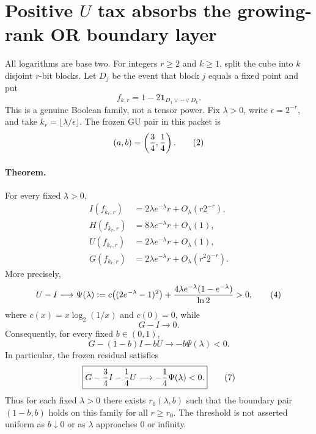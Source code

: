 \section*{Positive $U$ tax absorbs the growing-rank OR boundary layer}

All logarithms are base two.  For integers $r\ge2$ and
$k\ge1$, split the cube into $k$ disjoint $r$-bit blocks.  Let $D_j$
be the event that block $j$ equals a fixed point and put
\[
 f_{k,r}=1-2\mathbf 1_{D_1\vee\cdots\vee D_k}.
 \tag{1}
\]
This is a genuine Boolean family, not a tensor power.  Fix
$\lambda>0$, write $\epsilon=2^{-r}$, and take
$k_r=\lfloor\lambda/\epsilon\rfloor$.  The frozen GU pair in this
packet is
\[
 (a,b)=\left({3\over4},{1\over4}\right).
 \tag{2}
\]

\paragraph{Theorem.}
For every fixed $\lambda>0$,
\[
 \begin{aligned}
 I(f_{k_r,r})&=2\lambda e^{-\lambda}r+O_\lambda(r2^{-r}),\\
 H(f_{k_r,r})&=8\lambda e^{-\lambda}r+O_\lambda(1),\\
 U(f_{k_r,r})&=2\lambda e^{-\lambda}r+O_\lambda(1),\\
 G(f_{k_r,r})&=2\lambda e^{-\lambda}r+O_\lambda(r^2 2^{-r}).
 \end{aligned}                                                   \tag{3}
\]
More precisely,
\[
 U-I\longrightarrow
 \Psi(\lambda):=
 c\bigl((2e^{-\lambda}-1)^2\bigr)
 +{4\lambda e^{-\lambda}(1-e^{-\lambda})\over\ln2}>0,           \tag{4}
\]
where $c(x)=x\log_2(1/x)$ and $c(0)=0$, while
\[
 G-I\longrightarrow0.                                            \tag{5}
\]
Consequently, for every fixed $b\in(0,1)$,
\[
 \boxed{
 G-(1-b)I-bU\longrightarrow-b\Psi(\lambda)<0.}                  \tag{6}
\]
In particular, the frozen residual satisfies
\[
 \boxed{
 G-{3\over4}I-{1\over4}U
 \longrightarrow-{1\over4}\Psi(\lambda)<0.}                    \tag{7}
\]
Thus for each fixed $\lambda>0$ there exists
$r_0(\lambda,b)$ such that the boundary pair $(1-b,b)$ holds on this
family for all $r\ge r_0$.  The threshold is not asserted uniform as
$b\downarrow0$ or as $\lambda$ approaches $0$ or infinity.

